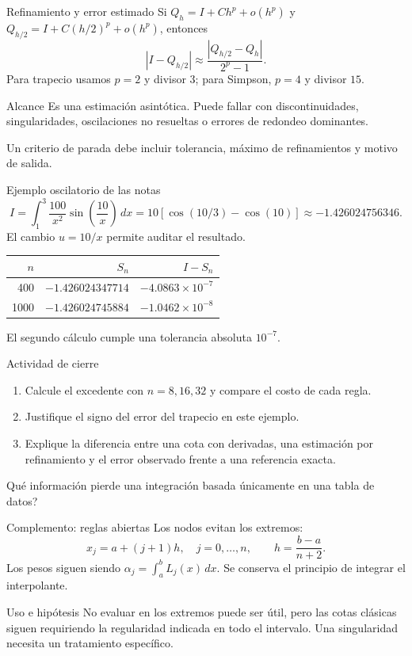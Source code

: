 \documentclass[aspectratio=169,12pt]{beamer}
\begin{document}
\begin{frame}{Refinamiento y error estimado}
Si $Q_h=I+Ch^p+o(h^p)$ y $Q_{h/2}=I+C(h/2)^p+o(h^p)$, entonces
\[|I-Q_{h/2}|\approx\frac{|Q_{h/2}-Q_h|}{2^p-1}.\]
Para trapecio usamos $p=2$ y divisor $3$; para Simpson, $p=4$ y divisor $15$.
\begin{block}{Alcance}
Es una estimación asintótica. Puede fallar con discontinuidades, singularidades,
oscilaciones no resueltas o errores de redondeo dominantes.
\end{block}
Un criterio de parada debe incluir tolerancia, máximo de refinamientos y motivo de salida.
\end{frame}

\begin{frame}{Ejemplo oscilatorio de las notas}
\[I=\int_1^3\frac{100}{x^2}\sin\left(\frac{10}{x}\right)\,dx
=10\left[\cos(10/3)-\cos(10)\right]\approx-1.426024756346.\]
El cambio $u=10/x$ permite auditar el resultado.
\begin{center}\begin{tabular}{rrr}\toprule
$n$&$S_n$&$I-S_n$\\\midrule
400&$-1.426024347714$&$-4.0863\times10^{-7}$\\
1000&$-1.426024745884$&$-1.0462\times10^{-8}$\\\bottomrule
\end{tabular}\end{center}
El segundo cálculo cumple una tolerancia absoluta $10^{-7}$.
\end{frame}

\begin{frame}{Actividad de cierre}
\begin{enumerate}
\item Calcule el excedente con $n=8,16,32$ y compare el costo de cada regla.
\item Justifique el signo del error del trapecio en este ejemplo.
\item Explique la diferencia entre una cota con derivadas, una estimación
por refinamiento y el error observado frente a una referencia exacta.
\end{enumerate}
\textquestiondown{}Qué información pierde una integración basada únicamente en una tabla de datos?
\end{frame}

\begin{frame}{Complemento: reglas abiertas}
Los nodos evitan los extremos:
\[x_j=a+(j+1)h,\quad j=0,\ldots,n,\qquad h=\frac{b-a}{n+2}.\]
Los pesos siguen siendo $\alpha_j=\int_a^b L_j(x)\,dx$.
Se conserva el principio de integrar el interpolante.
\begin{block}{Uso e hipótesis}
No evaluar en los extremos puede ser útil, pero las cotas clásicas siguen
requiriendo la regularidad indicada en todo el intervalo.
Una singularidad necesita un tratamiento específico.
\end{block}
\end{frame}
\end{document}
